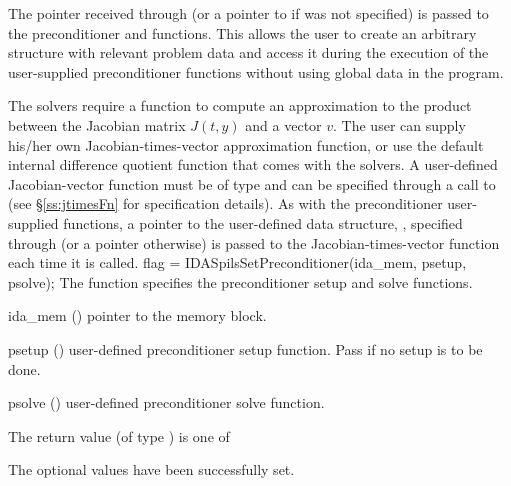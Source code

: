 {The pointer  received through  (or a pointer to 
if  was not specified) 
is passed to the preconditioner  and  functions.  
This allows the user to create an arbitrary structure with relevant problem data 
and access it during the execution of the user-supplied preconditioner functions
without using global data in the program.  

The {\idaspils} solvers require a function to compute an approximation to the
product between the Jacobian matrix $J(t,y)$ and a vector $v$.
The user can supply his/her own Jacobian-times-vector approximation function, 
or use the default internal difference quotient function
that comes with the {\idaspils} solvers.
A user-defined Jacobian-vector function must be of type 
and can be specified through a call to 
(see \S\ref{ss:jtimesFn} for specification details).
As with the preconditioner user-supplied functions,
a pointer to the user-defined data structure, , specified through
 (or a  pointer otherwise) is passed to the 
Jacobian-times-vector function  each time it is called.  
{
  flag = IDASpilsSetPreconditioner(ida\_mem, psetup, psolve);
}
{
  The function  specifies the preconditioner
  setup and solve functions.
}
{
  \begin{args}
  \item[ida\_mem] ()
    pointer to the {\ida} memory block.
  \item[psetup] ()
    user-defined preconditioner setup function.  Pass  if no
    setup is to be done.
  \item[psolve] ()
    user-defined preconditioner solve function.
  \end{args}
}
{
  The return value  (of type ) is one of
  \begin{args}
  \item[\Id{IDASPILS\_SUCCESS}] 
    The optional values have been successfully set.
  \item[\Id{IDASPILS\_MEM\_NULL}]

\end{args}}}
